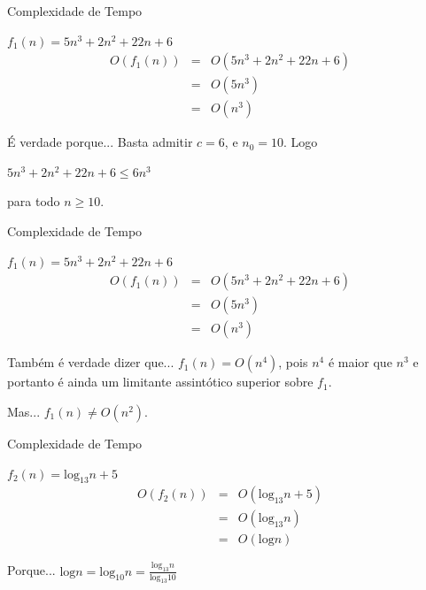 \documentclass[xcolor=dvipsnames,table]{beamer}
\begin{document}
	\begin{frame}{Complexidade de Tempo}
		\begin{block}{$f_1 (n) = 5n^3 + 2n^2 + 22n + 6$}
			\begin{eqnarray}
			O(f_1(n)) & = & O(5n^3 + 2n^2 + 22n + 6)\\
			& = & O(5n^3)\\
			& = & O(n^3)
			\end{eqnarray}
		\end{block}   
		\begin{exampleblock}{É verdade porque...}
			Basta admitir $c = 6$, e $n_0 = 10$. Logo
			\begin{center}
				$5n^3 + 2n^2 + 22n + 6 \leq 6n^3$
			\end{center}
			para todo $n \geq 10$.
		\end{exampleblock}
	\end{frame}
	
	\begin{frame}{Complexidade de Tempo}
		\begin{block}{$f_1 (n) = 5n^3 + 2n^2 + 22n + 6$}
			\begin{eqnarray}
			O(f_1(n)) & = & O(5n^3 + 2n^2 + 22n + 6)\\
			& = & O(5n^3)\\
			& = & O(n^3)
			\end{eqnarray}
		\end{block}   
		\begin{exampleblock}{Também é verdade dizer que...}
			$f_1(n) = O(n^4)$, pois $n^4$ é maior que $n^3$ e portanto é ainda um limitante assintótico superior sobre $f_1$.
		\end{exampleblock}   
		\begin{alertblock}{Mas...}
			$f_1(n) \not= O(n^2)$.
		\end{alertblock}
	\end{frame}
	
	\begin{frame}{Complexidade de Tempo}
		\begin{block}{$f_2 (n) = \mbox{log}_{13} n + 5$}
			\begin{eqnarray}   
			O(f_2(n)) & = & O(\mbox{log}_{13} n + 5)\\
			& = & O(\mbox{log}_{13} n)\\
			& = & O(\mbox{log} n)
			\end{eqnarray}
		\end{block}   
		\begin{exampleblock}{Porque...}
			$\mbox{log} n = \mbox{log}_{10} n  = \frac{\mbox{log}_{13} n}{\mbox{log}_{13} 10}$
		\end{exampleblock}
	\end{frame}
\end{document}
